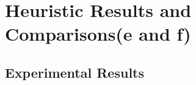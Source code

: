 
\section{Heuristic Results and Comparisons(e and f)}

\subsection{Experimental Results}
\newcommand{\ucstime}{21.9412 ms}
\newcommand{\ucsnode}{12907}
\newcommand{\ucslength}{179.66}


\newcommand{\aStarHOnetime}{21.6008 ms}
\newcommand{\aStarHOnenode}{10374}
\newcommand{\aStarHOnelength}{0.000  \%}

\newcommand{\aStarHTwotime}{2.9807 ms}
\newcommand{\aStarHTwonode}{460}
\newcommand{\aStarHTwolength}{-5.755  \%}

\newcommand{\aStarHThreetime}{0.9796 ms}
\newcommand{\aStarHThreenode}{217}
\newcommand{\aStarHThreelength}{-28.877 \%}

\newcommand{\aStarHFourtime}{1.8209 ms}
\newcommand{\aStarHFournode}{754}
\newcommand{\aStarHFourlength}{-16.932 \%}

\newcommand{\aStarHFivetime}{3.3776 ms}
\newcommand{\aStarHFivenode}{1660}
\newcommand{\aStarHFivelength}{-15.886 \%}


\newcommand{\aStarWeightedHOnetime}{23.4999 ms}
\newcommand{\aStarWeightedHOnenode}{9486}
\newcommand{\aStarWeightedHOnelength}{-1.747  \%}

\newcommand{\aStarWeightedHTwotime}{4.2639 ms}
\newcommand{\aStarWeightedHTwonode}{417}
\newcommand{\aStarWeightedHTwolength}{-4.386  \%}

\newcommand{\aStarWeightedHThreetime}{1.9081 ms}
\newcommand{\aStarWeightedHThreenode}{136}
\newcommand{\aStarWeightedHThreelength}{ -33.074 \%}

\newcommand{\aStarWeightedHFourtime}{1.4664 ms}
\newcommand{\aStarWeightedHFournode}{288}
\newcommand{\aStarWeightedHFourlength}{-30.669 \%}

\newcommand{\aStarWeightedHFivetime}{0.9395 ms}
\newcommand{\aStarWeightedHFivenode}{376}
\newcommand{\aStarWeightedHFivelength}{-22.821 \%}

\newcommand{\aStarWeightedTwoHOnetime}{14.2124 ms}
\newcommand{\aStarWeightedTwoHOnenode}{6773}
\newcommand{\aStarWeightedTwoHOnelength}{-5.143 \%}

\newcommand{\aStarWeightedTwoHTwotime}{2.0119 ms}
\newcommand{\aStarWeightedTwoHTwonode}{398}
\newcommand{\aStarWeightedTwoHTwolength}{ 0.256 \%}

